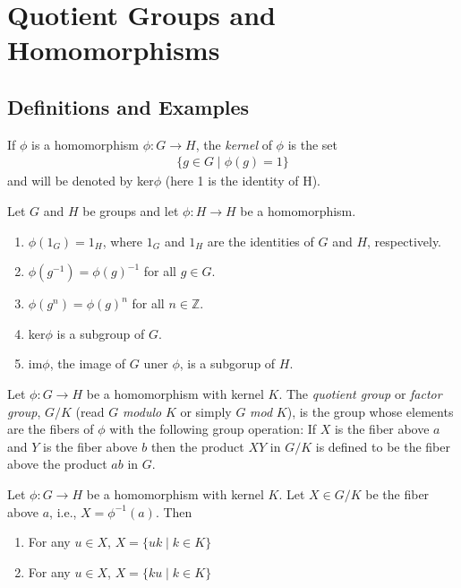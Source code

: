 \documentclass[../main]{subfiles}
\begin{document}
 
 \section{Quotient Groups and Homomorphisms}
 
 
 \subsection{Definitions and Examples}
 

 \begin{dfn}
  If $\phi$ is a homomorphism $\phi \colon G \to H$, the \textit{kernel} of $\phi$ is the set
  \begin{align*}
   \{g\in G \mid \phi(g)= 1\}
  \end{align*}
  and will be denoted by ker$\phi$ (here 1 is the identity of H).
 \end{dfn}

 
 \begin{prop}
  Let $G$ and $H$ be groups and let $\phi \colon H \to H$ be a homomorphism.
  \begin{enumerate}
   \item $\phi(1_G)=1_H$, where $1_G$ and $1_H$ are the identities of $G$ and $H$, respectively.
   \item $\phi(g^{-1})=\phi(g)^{-1}$ for all $g\in G$.
   \item $\phi(g^n)=\phi(g)^n$ for all $n\in \mathbb{Z}$.
   \item ker$\phi$ is a subgroup of $G$.
   \item im$\phi$, the image of $G$ uner $\phi$, is a subgorup of $H$.
  \end{enumerate}
 \end{prop}

 
 \begin{dfn}
  Let $\phi \colon G\to H$ be a homomorphism with kernel $K$. The \textit{quotient group} or \textit{factor group}, $G/K$ (read $G$ \textit{modulo} $K$ or simply $G$ \textit{mod} $K$), is the group whose elements are the fibers of $\phi$ with the following group operation: If $X$ is the fiber above $a$ and $Y$ is the fiber above $b$ then the product $XY$ in $G/K$ is defined to be the fiber above the product $ab$ in $G$.
 \end{dfn}

 
 \begin{prop}
  Let $\phi \colon G \to H$ be a homomorphism with kernel $K$. Let $X\in G/K$ be the fiber above $a$, i.e., $X=\phi^{-1}(a)$. Then 
  \begin{enumerate}
   \item For any $u\in X$,  $X=\{uk\mid k\in K\}$
   \item For any $u\in X$,  $X=\{ku\mid k\in K\}$
  \end{enumerate}
 \end{prop}
 
\end{document}

